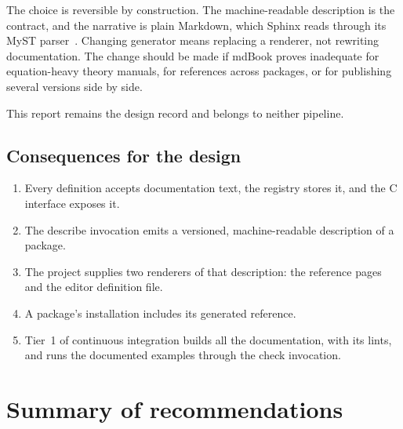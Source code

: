 \documentclass[11pt,a4paper]{article}
\begin{document}
The choice is reversible by construction.  The machine-readable description
is the contract, and the narrative is plain Markdown, which Sphinx reads
through its MyST parser~\cite{myst}.  Changing generator means replacing a
renderer, not rewriting documentation.  The change should be made if mdBook
proves inadequate for equation-heavy theory manuals, for references across
packages, or for publishing several versions side by side.

This report remains the design record and belongs to neither pipeline.

\subsection{Consequences for the design}

\begin{enumerate}
  \item Every definition accepts documentation text, the registry stores it,
        and the C interface exposes it.
  \item The describe invocation emits a versioned, machine-readable
        description of a package.
  \item The project supplies two renderers of that description: the
        reference pages and the editor definition file.
  \item A package's installation includes its generated reference.
  \item Tier~1 of continuous integration builds all the documentation, with
        its lints, and runs the documented examples through the check
        invocation.
\end{enumerate}

\section{Summary of recommendations}
\end{document}

